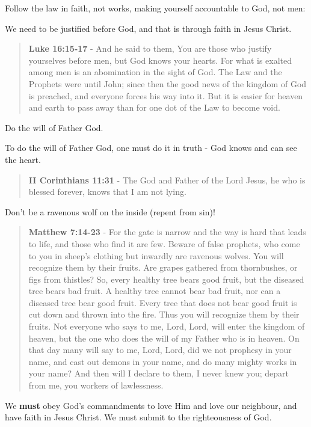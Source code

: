 \documentclass[11pt]{article}
\begin{document}
Follow the law in faith, not works, making yourself accountable to God, not men:

We need to be justified before God, and that is through faith in Jesus Christ.

\begin{quote}
\textbf{Luke 16:15-17} - And he said to them, You are those who justify yourselves before men, but God knows your hearts. For what is exalted among men is an abomination in the sight of God.  The Law and the Prophets were until John; since then the good news of the kingdom of God is preached, and everyone forces his way into it. But it is easier for heaven and earth to pass away than for one dot of the Law to become void.
\end{quote}

Do the will of Father God.

To do the will of Father God, one must do it in truth - God knows and can see the heart.

\begin{quote}
\textbf{II Corinthians 11:31} - The God and Father of the Lord Jesus, he who is blessed forever, knows that I am not lying.
\end{quote}

Don't be a ravenous wolf on the inside (repent from sin)!

\begin{quote}
\textbf{Matthew 7:14-23} - For the gate is narrow and the way is hard that leads to life, and those who find it are few.  Beware of false prophets, who come to you in sheep's clothing but inwardly are ravenous wolves.  You will recognize them by their fruits. Are grapes gathered from thornbushes, or figs from thistles?  So, every healthy tree bears good fruit, but the diseased tree bears bad fruit.  A healthy tree cannot bear bad fruit, nor can a diseased tree bear good fruit.  Every tree that does not bear good fruit is cut down and thrown into the fire.  Thus you will recognize them by their fruits.  Not everyone who says to me, Lord, Lord, will enter the kingdom of heaven, but the one who does the will of my Father who is in heaven.  On that day many will say to me, Lord, Lord, did we not prophesy in your name, and cast out demons in your name, and do many mighty works in your name?  And then will I declare to them, I never knew you; depart from me, you workers of lawlessness.
\end{quote}

We \textbf{must} obey God's commandments to love Him and love our neighbour, and have faith in Jesus Christ.
We must submit to the righteousness of God.
\end{document}
